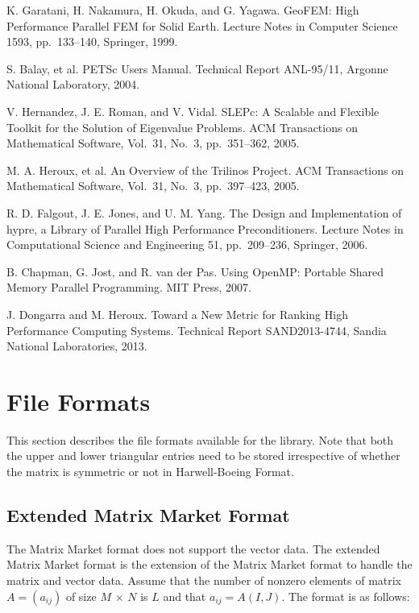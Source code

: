 \documentclass[a4paper]{article}
\begin{document}
\begin{thebibliography}{10}
K. Garatani, H. Nakamura, H. Okuda, and G. Yagawa.
\newblock GeoFEM: High Performance Parallel FEM for Solid Earth.
\newblock Lecture Notes in Computer Science 1593, pp.\ 133--140, Springer, 1999.

S. Balay, et al.
\newblock PETSc Users Manual.
\newblock Technical Report ANL-95/11, Argonne National Laboratory, 2004.

V. Hernandez, J. E. Roman, and V. Vidal.
\newblock SLEPc: A Scalable and Flexible Toolkit for the Solution of
	Eigenvalue Problems.
\newblock ACM Transactions on Mathematical Software,  Vol.~31, No.~3, pp.\ 351--362, 2005.

M. A. Heroux, et al.
\newblock An Overview of the Trilinos Project.
\newblock ACM Transactions on Mathematical Software,  Vol.~31, No.~3, pp.\ 397--423, 2005.

R. D. Falgout, J. E. Jones, and U. M. Yang.
\newblock The Design and Implementation of hypre, a Library of Parallel
	High Performance Preconditioners.
\newblock Lecture Notes in Computational Science and Engineering 51, pp.\ 209--236, Springer, 2006.

B. Chapman, G. Jost, and R. van der Pas.
\newblock Using OpenMP: Portable Shared Memory Parallel Programming.
\newblock MIT Press, 2007.

J. Dongarra and M. Heroux.
\newblock Toward a New Metric for Ranking High Performance Computing Systems.
\newblock Technical Report SAND2013-4744, Sandia National Laboratories, 2013.

\end{thebibliography}

\newpage
\appendix
\section{File Formats}
\label{sec:matinp}
This section describes the file formats available for the library.
Note that both the upper and lower triangular entries need to be stored
irrespective of whether the matrix is symmetric or not in Harwell-Boeing Format. 

\subsection{Extended Matrix Market Format}
The Matrix Market format does not support 
the vector data. The extended Matrix Market format is the extension of
the Matrix Market format to handle 
the matrix and vector data. Assume that the number of nonzero elements of
matrix $A=(a_{ij})$ of size $M$ $\times$ $N$ is $L$ and 
that $a_{ij} = A(I,J)$. The format is as follows: 
\end{document}
